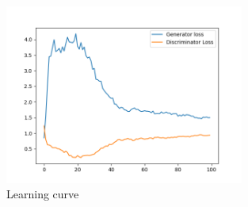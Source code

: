\documentclass[a4paper]{article}
\theoremstyle{definition}
\newenvironment{soln}{
	\leavevmode\color{blue}\ignorespaces
}{}
\begin{document}
\begin{enumerate} [label=(\alph*)]
\begin{soln}
			\begin{figure}[H]
				\centering
				\includegraphics[width=0.7\textwidth]{../figs/opt_loss.png}
				\caption{Learning curve}
				\label{fig:q3_loss}
			\end{figure}
			

\end{soln}
\end{enumerate}
\end{document}
